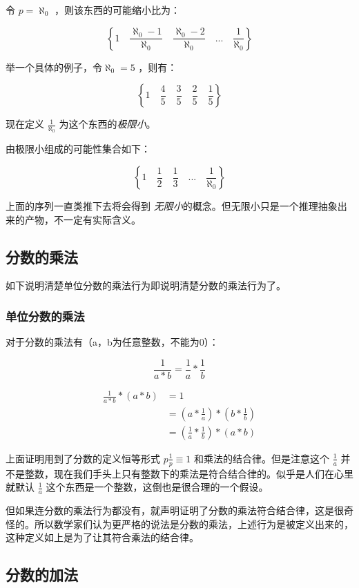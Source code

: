 \documentclass[12pt,oneside]{book}
\begin{document}
令 $p=\aleph_0$ ，则该东西的可能缩小比为：

\[
\left\{1 \quad \frac{\aleph_0-1}{\aleph_0} \quad \frac{\aleph_0-2}{\aleph_0} \quad  ...  \quad \frac{1}{\aleph_0} \right\}
\]

举一个具体的例子，令$\aleph_0 = 5$ ，则有：

\[
\left\{1 \quad \frac{4}{5} \quad \frac{3}{5} \quad  \frac{2}{5}  \quad \frac{1}{5} \right\}
\]

现在定义 $\frac{1}{\aleph_0}$ 为这个东西的\emph{极限小}。

由极限小组成的可能性集合如下：

\[
\left\{1 \quad \frac{1}{2} \quad \frac{1}{3} \quad  ...  \quad \frac{1}{\aleph_0} \right\}
\]


上面的序列一直类推下去将会得到 \emph{无限小}的概念。但无限小只是一个推理抽象出来的产物，不一定有实际含义。

\subsection{分数的乘法}
如下说明清楚单位分数的乘法行为即说明清楚分数的乘法行为了。

\subsubsection{单位分数的乘法}
对于分数的乘法有（a，b为任意整数，不能为0）：

\begin{equation}
\label{eq:17}
\frac{1}{a*b} = \frac{1}{a} * \frac{1}{b}
\end{equation}

\begin{align*}
\frac{1}{a*b} * (a*b) &=1\\
&= (a*\frac{1}{a}) * (b * \frac{1}{b})\\
&=(\frac{1}{a} * \frac{1}{b}) * (a*b)
\end{align*}

上面证明用到了分数的定义恒等形式 $p\frac{1}{p} \equiv 1$ 和乘法的结合律。但是注意这个 $\frac{1}{a}$ 并不是整数，现在我们手头上只有整数下的乘法是符合结合律的。似乎是人们在心里就默认 $\frac{1}{a}$ 这个东西是一个整数，这倒也是很合理的一个假设。

但如果连分数的乘法行为都没有，就声明证明了分数的乘法符合结合律，这是很奇怪的。所以数学家们认为更严格的说法是分数的乘法，上述行为是被定义出来的，这种定义如上是为了让其符合乘法的结合律。



\subsection{分数的加法}
\end{document}
